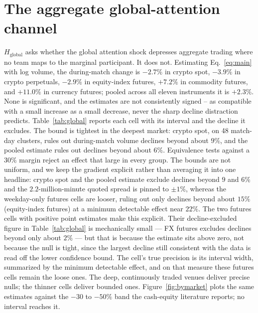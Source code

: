 \documentclass[12pt]{article}
\begin{document}
\section{The aggregate global-attention channel}\label{sec:global}
$H_{\text{global}}$ asks whether the global attention shock depresses aggregate trading where no team maps to the marginal participant. It does not. Estimating Eq.~\eqref{eq:main} with log volume, the during-match change is $-2.7\%$ in crypto spot, $-3.9\%$ in crypto perpetuals, $-2.9\%$ in equity-index futures, $+7.2\%$ in commodity futures, and $+11.0\%$ in currency futures; pooled across all eleven instruments it is $+2.3\%$. None is significant, and the estimates are not consistently signed -- as compatible with a small increase as a small decrease, never the sharp decline distraction predicts. Table~\ref{tab:global} reports each cell with its interval and the decline it excludes. The bound is tightest in the deepest market: crypto spot, on 48 match-day clusters, rules out during-match volume declines beyond about $9\%$, and the pooled estimate rules out declines beyond about $6\%$. Equivalence tests against a $30\%$ margin reject an effect that large in every group. The bounds are not uniform, and we keep the gradient explicit rather than averaging it into one headline: crypto spot and the pooled estimate exclude declines beyond $9$ and $6\%$ and the $2.2$-million-minute quoted spread is pinned to $\pm1\%$, whereas the weekday-only futures cells are looser, ruling out only declines beyond about $15\%$ (equity-index futures) at a minimum detectable effect near $22\%$. The two futures cells with positive point estimates make this explicit. Their decline-excluded figure in Table~\ref{tab:global} is mechanically small --- FX futures excludes declines beyond only about $2\%$ --- but that is because the estimate sits above zero, not because the null is tight, since the largest decline still consistent with the data is read off the lower confidence bound. The cell's true precision is its interval width, summarized by the minimum detectable effect, and on that measure these futures cells remain the loose ones. The deep, continuously traded venues deliver precise nulls; the thinner cells deliver bounded ones. Figure~\ref{fig:bymarket} plots the same estimates against the $-30$ to $-50\%$ band the cash-equity literature reports; no interval reaches it.
\end{document}
